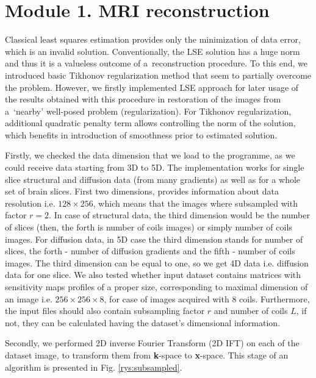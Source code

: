 \section{Module 1. MRI reconstruction}

Classical least squares estimation provides only the minimization of data error, which is an invalid solution. Conventionally, the LSE solution has a huge norm and thus it is a valueless outcome of a~reconstruction procedure. To this end, we introduced basic Tikhonov regularization method that seem to partially overcome the problem. However, we firstly implemented LSE approach for later usage of the results obtained with this procedure in restoration of the images from a~`nearby' well-posed problem (regularization). For Tikhonov regularization, additional quadratic penalty term allows controlling the norm of the solution, which benefits in introduction of smoothness prior to estimated solution. 

Firstly, we checked the data dimension that we load to the programme, as we could receive data starting from 3D to 5D. The implementation works for single slice structural and diffusion data (from many gradients) as well as for a whole set of brain slices. First two dimensions, provides information about data resolution i.e. $128\times 256$, which means that the images where subsampled with factor $r=2$. In case of structural data, the third dimension would be the number of slices (then, the forth is number of coils images) or simply number of coils images. For diffusion data, in 5D case the third dimension stands for number of slices, the forth - number of diffusion gradients and the fifth - number of coils images. The third dimension can be equal to one, so we get 4D data i.e. diffusion data for one slice. We also tested whether input dataset contains matrices with sensitivity maps profiles of a proper size, corresponding to maximal dimension of an image i.e. $256\times 256\times 8$, for case of images acquired with $8$ coils. Furthermore, the input files should also contain subsampling factor $r$ and number of coils $L$, if not, they can be calculated having the dataset's dimensional information.
 
Secondly, we performed 2D inverse Fourier Transform (2D IFT) on each of the dataset image, to transform them from \textbf{k}-space to \textbf{x}-space. This stage of an algorithm is presented in Fig. \ref{rys:subsampled}.  

